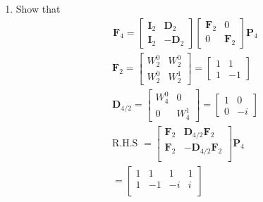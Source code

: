\documentclass[journal,12pt,twocolumn]{IEEEtran}
\let\vec\mathbf
\renewcommand\thesection{\arabic{section}}
\begin{document}
\begin{enumerate}[label=\arabic*.,ref=\thesection.\theenumi]
\item Show that 
\begin{align}
	\vec{F}_{4}=
	\begin{bmatrix}
		\vec{I}_{2} & \vec{D}_{2} \\
		\vec{I}_{2} & -\vec{D}_{2}
	\end{bmatrix}
	\begin{bmatrix}
		\vec{F}_{2} & 0 \\
		0 & \vec{F}_{2}
	\end{bmatrix}
	\vec{P}_{4}
\end{align}
\solution
\begin{align}
	\vec{F}_{2} = 
	\begin{bmatrix}
		W_{2}^0	&	W_{2}^0\\
		W_{2}^0	&	W_{2}^1
	\end{bmatrix}
	=		\begin{bmatrix}
		1	&	1\\
		1	&	-1
	\end{bmatrix}\\
	\vec{D}_{4/2} =
	\begin{bmatrix}
		W_4^0 &	0\\
		0	&	W_4^1 
	\end{bmatrix}
	=\begin{bmatrix}
		1	&	0\\
		0	&	-i 
	\end{bmatrix}\\
\text{R.H.S } = 
\begin{bmatrix}
	\vec{F}_{2} & \vec{D}_{4/2} \vec{F}_{2}\\
	\vec{F}_{2} & -\vec{D}_{4/2} \vec{F}_{2}\\
\end{bmatrix}\vec{P}_{4}\\
		=\begin{bmatrix}
		1	&	1	&	1	&	1\\
		1	&	-1	&	-i	&	i\\

\end{bmatrix}
\end{align}
\end{enumerate}
\end{document}
